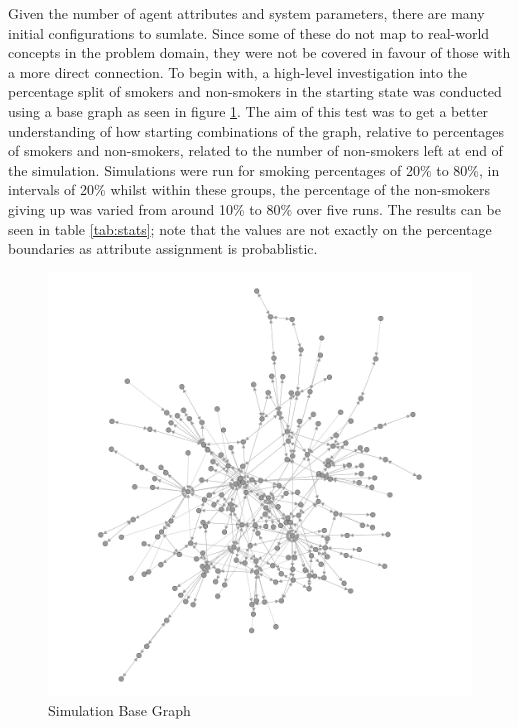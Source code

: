 \documentclass[]{report}
\begin{document}
Given the number of agent attributes and system parameters, there are many initial configurations to sumlate. Since some of these do not map to real-world concepts in the problem domain, they were not be covered in favour of those with a more direct connection. To begin with, a high-level investigation into the percentage split of smokers and non-smokers in the starting state was conducted using a base graph as seen in figure \ref{img:simbase}. The aim of this test was to get a better understanding of how starting combinations of the graph, relative to percentages of smokers and non-smokers, related to the number of non-smokers left at end of the simulation. Simulations were run for smoking percentages of 20\% to 80\%, in intervals of 20\% whilst within these groups, the percentage of the non-smokers giving up was varied from around 10\% to 80\% over five runs. The results can be seen in table \ref{tab:stats}; note that the values are not exactly on the percentage boundaries as attribute assignment is probablistic.


\begin{figure}
\begin{center}
\includegraphics[scale=0.5]{simbase.png}
\end{center}
\caption{Simulation Base Graph}
\label{img:simbase}
\end{figure}
\end{document}
